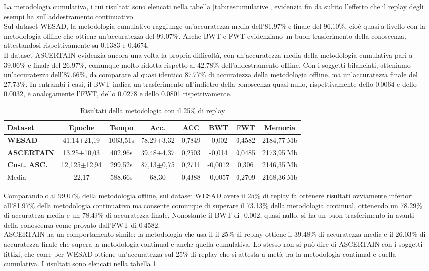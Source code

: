 La metodologia cumulativa, i cui risultati sono elencati nella tabella \ref{tab:rescumulative}, evidenzia fin da subito l'effetto che il replay degli esempi ha sull'addestramento continuativo.\\
Sul dataset WESAD, la metodologia cumulativo raggiunge un'accuratezza media dell'81.97\% e finale del 96.10\%, cioè quasi a livello con la metodologia offline che ottiene un'accuratezza del 99.07\%. Anche BWT e FWT evidenziano un buon trasferimento della conoscenza, attestandosi rispettivamente su 0.1383 e 0.4674.\\
Il dataset ASCERTAIN evidenzia ancora una volta la propria difficoltà, con un'accuratezza media della metodologia cumulativa pari a 39.06\% e finale del 26.97\%, comunque molto ridotta rispetto al 42.78\% dell'addestramento offline. Con i soggetti bilanciati, otteniamo un'accuratezza dell'87.66\%, da comparare al quasi identico 87.77\% di accuratezza della metodologia offline, ma un'accuratezza finale del 27.73\%. In entrambi i casi, il BWT indica un trasferimento all'indietro della conoscenza quasi nullo, rispettivamente dello 0.0064 e dello 0.0032, e analogamente l'FWT, dello 0.0278 e dello 0.0801 rispettivamente.

\begin{table}[h]
\footnotesize
    \begin{tabular}{l|c|c|c|c|c|c|c}
        \textbf{Dataset} & \textbf{Epoche} & \textbf{Tempo} & \textbf{Acc.} & \textbf{ACC} & \textbf{BWT} & \textbf{FWT} & \textbf{Memoria}\\
        \hline
        \textbf{WESAD} & 41,14$\pm$21,19 & 1063,51s & 78,29$\pm$3,32 & 0,7849 & -0,002 & 0,4582 & 2184,77 Mb\\
        \textbf{ASCERTAIN} & 13,25$\pm$10,03 & 402,96s & 39,48$\pm$4,37 & 0,2603 & -0,014 & 0,0485 & 2173,95 Mb\\
        \textbf{Cust. ASC.} & 12,125$\pm$12,94 & 299,52s & 87,13$\pm$0,75 & 0,2711 & -0,0012 & 0,306 & 2146,35 Mb\\
        \hline
        Media & 22,17 & 588,66s & 68,30 & 0,4388 & -0,0057 & 0,2709 & 2168,36 Mb
    \end{tabular}
    \caption{Risultati della metodologia con il 25\% di replay}
    \label{tab:resreplay}
\end{table}
Comparandolo al 99.07\% della metodologia offline, sul dataset WESAD avere il 25\% di replay fa ottenere risultati ovviamente inferiori all'81.97\% della metodologia continuativo ma consente comunque di superare il 73.13\% della metodologia continual, ottenendo un 78.29\% di accurateza media e un 78.49\% di accuratezza finale. Nonostante il BWT di -0.002, quasi nullo, si ha un buon trasferimento in avanti della conoscenza come provato dall'FWT di 0.4582.\\
ASCERTAIN ha un comportamento simile: la metodologia che usa il il 25\% di replay ottiene il 39.48\% di accuratezza media e il 26.03\% di accuratezza finale che supera la metodologia continual e anche quella cumulativa. Lo stesso non si può dire di ASCERTAIN con i soggetti fittizi, che come per WESAD ottiene un'accuratezza sul 25\% di replay che si attesta a metà tra la metodologia continual e quella cumulativa. I risultati sono elencati nella tabella \ref{tab:resreplay}

